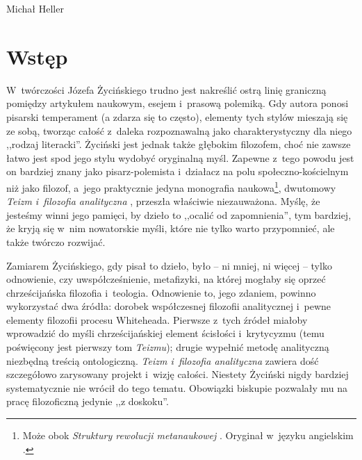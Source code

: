\begin{artplenv}{Michał Heller}
\section{Wstęp}
\lettrine[loversize=0.13,lines=2,lraise=-0.01,nindent=0em,findent=0.2pt]%
{W}{}~twórczości Józefa Życińskiego trudno jest nakreślić ostrą linię graniczną pomiędzy artykułem naukowym, esejem i~prasową polemiką. Gdy autora ponosi pisarski temperament (a zdarza się to często), elementy tych stylów mieszają się ze sobą, tworząc całość z~daleka rozpoznawalną jako charakterystyczny dla niego ,,rodzaj literacki''. Życiński jest jednak także głębokim filozofem, choć nie zawsze łatwo jest spod jego stylu wydobyć oryginalną myśl. Zapewne z~tego powodu jest on bardziej znany jako pisarz-polemista i~działacz na polu społeczno-kościelnym niż jako filozof, a~jego praktycznie jedyna monografia naukowa\footnote{ Może obok \textit{Struktury rewolucji metanaukowej}
\parencite[][]{zycinski_struktura_2013}. %
 Oryginał w~języku angielskim 
\parencite[][]{zycinski_structure_1988}.%
}, dwutomowy \textit{Teizm i~filozofia analityczna} 
\parencites{zycinski_teizm_1985}[][]{zycinski_teizm_1988}, %
 przeszła właściwie niezauważona. Myślę, że jesteśmy winni jego pamięci, by dzieło to ,,ocalić od zapomnienia'', tym bardziej, że kryją się w~nim nowatorskie myśli, które nie tylko warto przypomnieć, ale także twórczo rozwijać.

Zamiarem Życińskiego, gdy pisał to dzieło, było -- ni mniej, ni więcej -- tylko odnowienie, czy uwspółcześnienie, metafizyki, na której mogłaby się oprzeć chrześcijańska filozofia i~teologia. Odnowienie to, jego zdaniem, powinno wykorzystać dwa źródła: dorobek współczesnej filozofii analitycznej i~pewne elementy filozofii procesu Whiteheada. Pierwsze z~tych źródeł miałoby wprowadzić do myśli chrześcijańskiej element ścisłości i~krytycyzmu (temu poświęcony jest pierwszy tom \textit{Teizmu}); drugie wypełnić metodę analityczną niezbędną treścią ontologiczną. \textit{Teizm i~filozofia analityczna} zawiera dość szczegółowo zarysowany projekt i~wizję całości. Niestety Życiński nigdy bardziej systematycznie nie wrócił do tego tematu. Obowiązki biskupie pozwalały mu na pracę filozoficzną jedynie ,,z doskoku''.


\end{artplenv}
